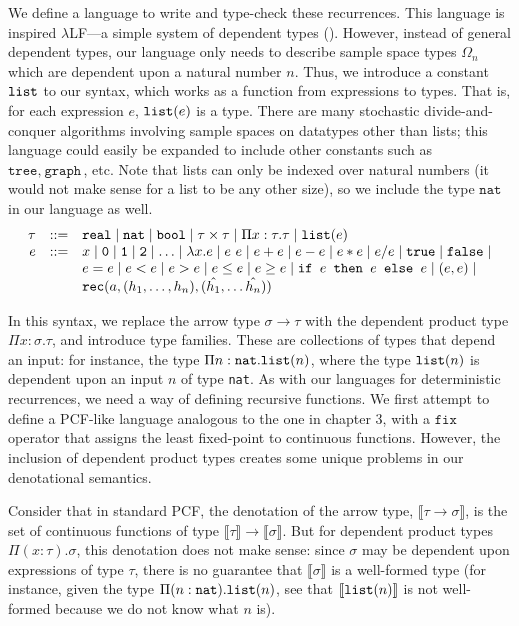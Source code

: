 We define a language to write and type-check these recurrences. This language is inspired $\lambda$LF---a simple system of 
dependent types (\cite{Pierce:2005aa}). However, instead of general dependent types, our language only needs to
describe sample space types $\Omega_n$ which are dependent upon a natural number $n$. Thus, we introduce
a constant $\texttt{list}$ to our syntax, which works as a function from expressions to types. That is, for each 
expression $e$, $\texttt{list}(e)$ is a type. There are many stochastic divide-and-conquer algorithms involving sample spaces
on datatypes other than lists; this language could easily be expanded to include other constants such as
 $\texttt{tree}, \ \texttt{graph}$, etc. Note that lists can only be indexed over natural numbers (it would not make 
 sense for a list to be any other size), so we include the type $\texttt{nat}$ in our language as well.
 \[
\begin{array}{rcl}
\tau &::=& \texttt{real} \mid \texttt{nat} \mid \texttt{bool} \mid \tau \times \tau \mid \Pi x:\tau.\tau
\mid \texttt{list}(e) \\
e &::=& x  \mid \texttt{0} \mid \texttt{1} \mid \texttt{2} \mid \dotsc \mid \lambda x.e \mid e \ e \mid e + e \mid e - e \mid  e  *  e \mid e / e \mid \texttt{true} \mid \texttt{false} \mid \\
  && e  =  e \mid e < e \mid e > e \mid e \leq e \mid e \geq e \mid 
     \texttt{if } e \texttt{ then } e \texttt{ else } e \mid (e,e) \mid \\
     && \texttt{rec}(a, (h_1, \ldots, h_n), (\hat{h_1}, \ldots \hat{h_n})) 
\end{array}
\]

In this syntax, we replace the arrow type $\sigma \rightarrow \tau$ with the dependent product type
$\Pi x:\sigma.\tau$, and introduce type families. 
These are collections of types that depend an input: for instance,
the type $\Pi n:\texttt{nat}.\texttt{list}(n)$, where the type $\texttt{list}(n)$ is dependent upon an input $n$ of type \texttt{nat}.
As with our languages for deterministic recurrences, we need a way of defining recursive functions. We first attempt
to define a PCF-like language analogous to the one in chapter 3, with a $\texttt{fix}$ operator that assigns the least
fixed-point to continuous functions. However, the inclusion of dependent product types creates some unique problems
in our denotational semantics.

Consider that in standard PCF, the denotation of the arrow type, $\llbracket \tau \rightarrow \sigma \rrbracket$, is the
set of continuous functions of type
$\llbracket \tau \rrbracket \rightarrow \llbracket \sigma \rrbracket$. But for dependent product types $\Pi(x:\tau).\sigma$,
this denotation does not make sense: 
since $\sigma$ may be dependent upon expressions of type $\tau$, there is no guarantee
that $\llbracket \sigma \rrbracket$ is a well-formed type (for instance, given the type $\Pi(n:\texttt{nat}).\texttt{list}(n)$, see that
$\llbracket \texttt{list}(n) \rrbracket$ is not well-formed because we do not know what $n$ is).

